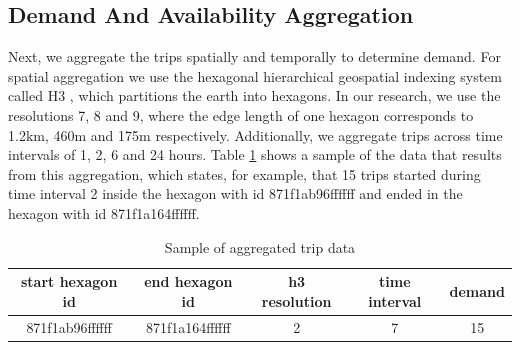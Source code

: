 \subsection{Demand And Availability Aggregation}
Next, we aggregate the trips spatially and temporally to determine demand. For spatial aggregation we use the hexagonal hierarchical geospatial indexing system called H3 , which partitions the earth into hexagons. %
In our research, we use the resolutions 7, 8 and 9, where the edge length of one hexagon corresponds to 1.2km, 460m and 175m respectively.
Additionally, we aggregate trips across time intervals of 1, 2, 6 and 24 hours. Table \ref{table:aggregated_trips} shows a sample of the data that results from this aggregation, which states, for example, that 15 trips started during time interval 2 inside the hexagon with id 871f1ab96ffffff and ended in the hexagon with id 871f1a164ffffff.

\begin{table}[h!]
    \centering
    \begin{tabular}{ |c|c|c|c|c| }
        \hline
        \textbf{start hexagon id} & \textbf{end hexagon id} & \textbf{h3 resolution} & \textbf{time interval} & \textbf{demand} \\
        \hline
        871f1ab96ffffff & 871f1a164ffffff & 2 & 7 & 15 \\
         \hline
    \end{tabular}
    \caption{Sample of aggregated trip data}
    \label{table:aggregated_trips}
\end{table}



